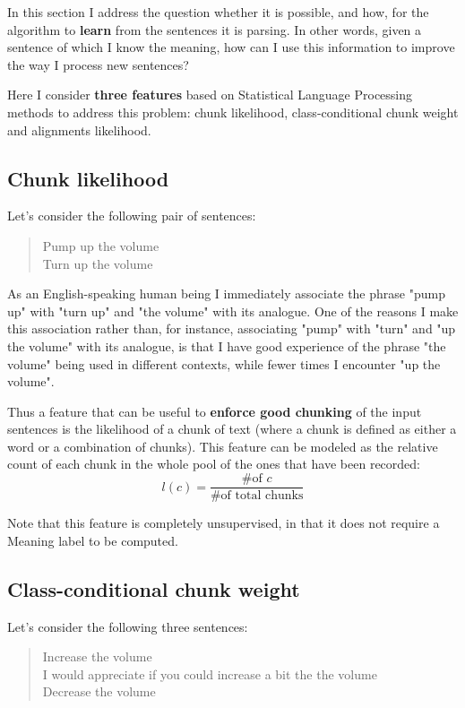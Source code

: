 In this section I address the question whether it is possible, and how, for the algorithm to \textbf{learn} from the sentences it is parsing. In other words, given a sentence of which I know the meaning, how can I use this information to improve the way I process new sentences?

Here I consider \textbf{three features} based on Statistical Language Processing methods to address this problem: chunk likelihood, class-conditional chunk weight and alignments likelihood.

\subsection{Chunk likelihood}
Let's consider the following pair of sentences:
\begin{quote}
Pump up the volume\\
Turn up the volume
\end{quote}

As an English-speaking human being I immediately associate the phrase "pump up" with "turn up" and "the volume" with its analogue. One of the reasons I make this association rather than, for instance, associating "pump" with "turn" and "up the volume" with its analogue, is that I have good experience of the phrase "the volume" being used in different contexts, while fewer times I encounter "up the volume".

Thus a feature that can be useful to \textbf{enforce good chunking} of the input sentences is the likelihood of a chunk of text (where a chunk is defined as either a word or a combination of chunks). This feature can be modeled as the relative count of each chunk in the whole pool of the ones that have been recorded:
$$
l(c)=\frac{\text{\# of }c}{\text{\# of total chunks}}
$$

Note that this feature is completely unsupervised, in that it does not require a Meaning label to be computed.
\subsection{Class-conditional chunk weight}
Let's consider the following three sentences:
\begin{quote}
Increase the volume\\
I would appreciate if you could increase a bit the the volume\\
Decrease the volume
\end{quote}

